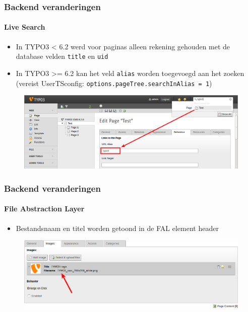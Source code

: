 
\begin{frame}[fragile]
	\frametitle{Backend veranderingen}
	\framesubtitle{Live Search}

	\begin{itemize}
		\item In TYPO3 < 6.2 werd voor paginas alleen rekening gehouden met de database velden \texttt{title} en \texttt{uid}
		\item In TYPO3 >= 6.2 kan het veld \texttt{alias} worden toegevoegd aan het zoeken \newline
			(vereist UserTSconfig: \texttt{options.pageTree.searchInAlias = 1})
	\end{itemize}

	\begin{figure}
		\includegraphics[width=0.95\linewidth]{Images/BackendChanges/LiveSearchInAlias.png}
	\end{figure}

\end{frame}


\begin{frame}[fragile]
	\frametitle{Backend veranderingen}
	\framesubtitle{File Abstraction Layer}

	\begin{itemize}
		\item Bestandsnaam en titel worden getoond in de FAL element header
	\end{itemize}

	\begin{figure}
		\includegraphics[width=0.95\linewidth]{Images/BackendChanges/FalTitleAndFilename.png}
	\end{figure}

\end{frame}

